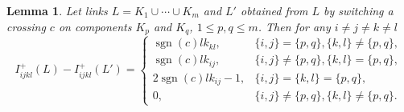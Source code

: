 \documentclass{article}
\newtheorem{lemma}{Lemma}
\theoremstyle{definition}
\theoremstyle{remark}
\DeclareMathOperator{\sgn}{\mathrm{sgn}}
\begin{document}
\begin{lemma}\label{lem:component_cocycle_ijkl}
    Let links $L=K_1\cup\cdots\cup K_m$ and $L'$ obtained from $L$ by switching a crossing $c$ on components $K_p$ and $K_q$, $1\le p,q\le m$. Then for any $i\ne j\ne k\ne l$
\begin{equation}
   I^+_{ijkl}(L)-I^+_{ijkl}(L')=\left\{\begin{array}{cl}
        \sgn(c)lk_{kl}, & \{i,j\}=\{p,q\}, \{k,l\}\ne\{p,q\}, \\
        \sgn(c)lk_{ij}, & \{i,j\}\ne\{p,q\}, \{k,l\}=\{p,q\}, \\
        2\sgn(c)lk_{ij}-1, & \{i,j\}=\{k,l\}=\{p,q\}, \\
        0, &   \{i,j\}\ne\{p,q\}, \{k,l\}\ne\{p,q\}.
    \end{array}\right.
\end{equation}
\end{lemma}
\end{document}
